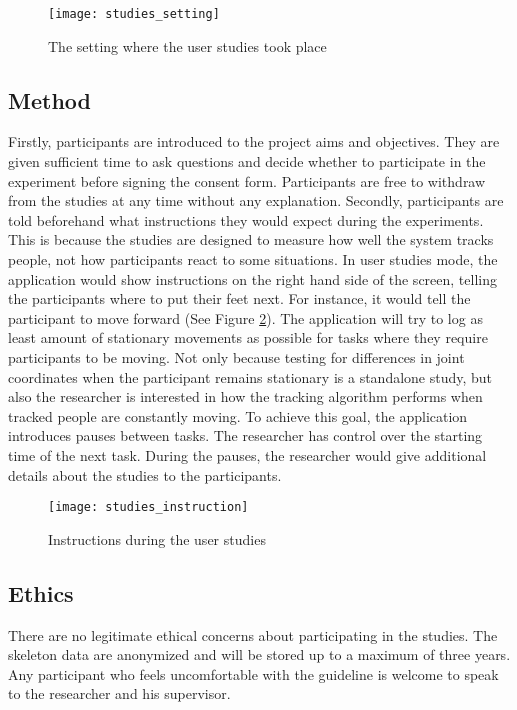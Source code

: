 \begin{figure}[h!]
  \centering
  \texttt{[image: studies\_setting]}
  \caption{The setting where the user studies took place}
  \label{fig:studies_setting}
\end{figure}

\subsection{Method}

Firstly, participants are introduced to the project aims and objectives. They are given sufficient time to ask questions and decide whether to participate in the experiment before signing the consent form. Participants are free to withdraw from the studies at any time without any explanation. Secondly, participants are told beforehand what instructions they would expect during the experiments. This is because the studies are designed to measure how well the system tracks people, not how participants react to some situations. In user studies mode, the application would show instructions on the right hand side of the screen, telling the participants where to put their feet next. For instance, it would tell the participant to move forward (See Figure \ref{fig:studies_instruction}). The application will try to log as least amount of stationary movements as possible for tasks where they require participants to be moving. Not only because testing for differences in joint coordinates when the participant remains stationary is a standalone study, but also the researcher is interested in how the tracking algorithm performs when tracked people are constantly moving. To achieve this goal, the application introduces pauses between tasks. The researcher has control over the starting time of the next task. During the pauses, the researcher would give additional details about the studies to the participants.

\begin{figure}[h!]
  \centering
  \texttt{[image: studies\_instruction]}
  \caption{Instructions during the user studies}
  \label{fig:studies_instruction}
\end{figure}

\subsection{Ethics}

There are no legitimate ethical concerns about participating in the studies. The skeleton data are anonymized and will be stored up to a maximum of three years. Any participant who feels uncomfortable with the guideline is welcome to speak to the researcher and his supervisor.

